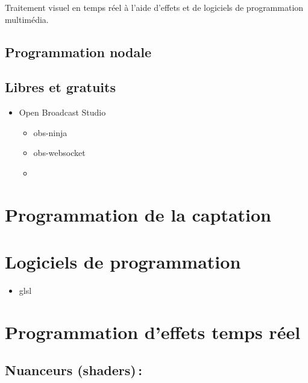 \documentclass[
  french,
]{book}
\providecommand{\tightlist}{%
  \setlength{\itemsep}{0pt}\setlength{\parskip}{0pt}}
\begin{document}
Traitement visuel en temps réel à l'aide d'effets et de logiciels de programmation multimédia.

\hypertarget{programmation-nodale}{%
\subsection{Programmation nodale}\label{programmation-nodale}}

\hypertarget{libres-et-gratuits}{%
\subsection{Libres et gratuits}\label{libres-et-gratuits}}

\begin{itemize}
\tightlist
\item
  Open Broadcast Studio

  \begin{itemize}
  \tightlist
  \item
    obs-ninja
  \item
    obs-websocket
  \item
  \end{itemize}
\end{itemize}

\hypertarget{programmer_grab}{%
\section{Programmation de la captation}\label{programmer_grab}}

\hypertarget{programmer_logiciels}{%
\section{Logiciels de programmation}\label{programmer_logiciels}}

\begin{itemize}
\tightlist
\item
  glsl
\end{itemize}

\hypertarget{programmation-deffets-temps-ruxe9el}{%
\section{Programmation d'effets temps réel}\label{programmation-deffets-temps-ruxe9el}}

\hypertarget{nuanceurs-shaders}{%
\subsection{Nuanceurs (shaders)\,:}\label{nuanceurs-shaders}}
\end{document}

